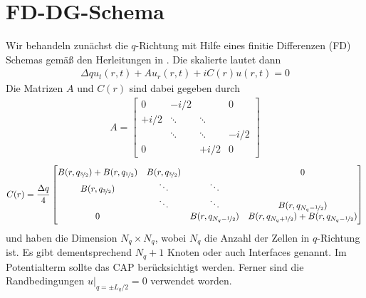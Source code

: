 \section{FD-DG-Schema}
\label{sec:FD-DG-Schema}
Wir behandeln zunächst die $q$-Richtung mit Hilfe eines finitie Differenzen (FD) Schemas gemäß den Herleitungen in \cite{lukas1}. Die skalierte \lvn lautet dann
\begin{align}
  \Delta q u_t(r,t) + A u_r(r,t) + iC(r)u(r,t) = 0
  \label{eq:FDschema}
\end{align}
Die Matrizen $A$ und $C(r)$ sind dabei gegeben durch
\begin{align}
  A =
  \left[ \begin{matrix}
    0    & -i/2   &         & 0     \\
    +i/2 & \ddots & \ddots  &       \\
         & \ddots & \ddots  &  -i/2 \\
    0    &        & +i/2    & 0
  \end{matrix}  \right]
\end{align}
\begin{align}
  C(r) = \frac{\Delta q}{4}
  \left[ \begin{matrix}
    B(r,q_{\nicefrac{3}{2}}) + B(r,q_{\nicefrac{1}{2}})    & B(r,q_{\nicefrac{3}{2}})   &         & 0     \\
    B(r,q_{\nicefrac{3}{2}})                               & \ddots                     & \ddots  &       \\
         & \ddots & \ddots                                 &  B(r,q_{N_q-\nicefrac{1}{2}}) \\
    0    &        & B(r,q_{N_q-\nicefrac{1}{2}})           & B(r,q_{N_q+\nicefrac{1}{2}}) + B(r,q_{N_q-\nicefrac{1}{2}})
  \end{matrix}  \right]
\end{align}
und haben die Dimension $N_q \times N_q$, wobei $N_q$ die Anzahl der Zellen in $q$-Richtung ist. Es gibt dementsprechend $N_q+1$ Knoten oder auch Interfaces genannt. Im Potentialterm sollte das CAP berücksichtigt werden. Ferner sind die Randbedingungen $u|_{q=\pm L_q/2} = 0$ verwendet worden.

